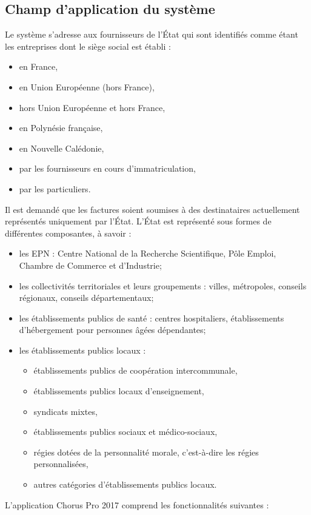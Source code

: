 \documentclass[12pt,a4paper]{article}
\begin{document}
\subsection{Champ d'application du système}
Le système s'adresse aux fournisseurs de l'État qui sont identifiés comme étant les entreprises dont le siège social est établi :
\smallbreak
\begin{itemize}
\item en France,
\item en Union Européenne (hors France),
\item hors Union Européenne et hors France,
\item en Polynésie française,
\item en Nouvelle Calédonie,
\item par les fournisseurs en cours d’immatriculation,
\item par les particuliers.
\end{itemize}
\bigbreak
Il est demandé que les factures soient soumises à des destinataires actuellement représentés uniquement par l'État. L'État est représenté sous formes de différentes composantes, à savoir :
\smallbreak
\begin{itemize}
\item les \gls{EPN} : Centre National de la Recherche Scientifique, Pôle Emploi, Chambre de Commerce et d'Industrie;
\item les collectivités territoriales et leurs groupements : villes, métropoles, conseils
régionaux, conseils départementaux;
\item les établissements publics de santé : centres hospitaliers, établissements d'hébergement pour personnes âgées dépendantes;
\item les établissements publics locaux :
\medbreak
\begin{itemize}
\item établissements publics de coopération intercommunale,
\item établissements publics locaux d’enseignement,
\item syndicats mixtes,
\item établissements publics sociaux et médico-sociaux,
\item régies dotées de la personnalité morale, c’est-à-dire les régies personnalisées,
\item autres catégories d’établissements publics locaux.
\end{itemize}
\end{itemize}
\newpage
L'application Chorus Pro 2017 comprend les fonctionnalités suivantes :
\end{document}
